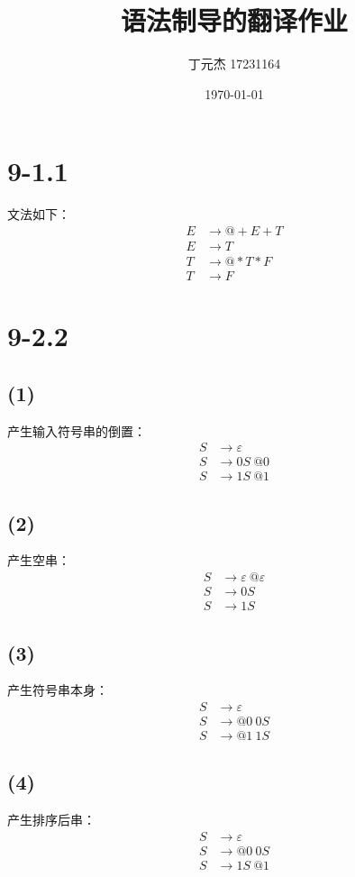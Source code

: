 \documentclass[UTF8]{ctexart}
\title{语法制导的翻译作业}
\author{丁元杰 17231164}
\date{\today}
\begin{document}
\maketitle

\section*{9-1.1}
文法如下：
\begin{align*}
    E &\to @ +E+T\\
    E &\to T \\
    T &\to @ *T*F\\
    T &\to F
\end{align*}

\section*{9-2.2}
\subsection*{(1)}
产生输入符号串的倒置：
\begin{align*}
    S &\to \varepsilon\\
    S &\to 0S\ @0\\
    S &\to 1S\ @1
\end{align*}

\subsection*{(2)}
产生空串：
\begin{align*}
    S &\to \varepsilon\ @\varepsilon\\
    S &\to 0S\\
    S &\to 1S
\end{align*}

\subsection*{(3)}
产生符号串本身：
\begin{align*}
    S &\to \varepsilon\\
    S &\to @0\ 0S\\
    S &\to @1\ 1S
\end{align*}

\subsection*{(4)}
产生排序后串：
\begin{align*}
    S &\to \varepsilon\\
    S &\to @0\ 0S\\
    S &\to 1S\ @1
\end{align*}
\end{document}

